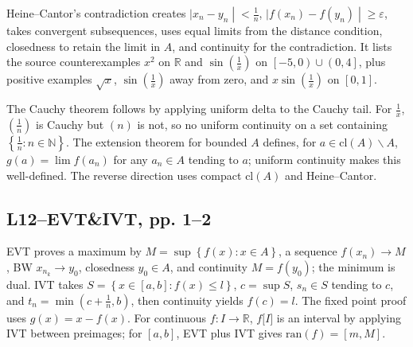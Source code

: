 Heine--Cantor's contradiction creates \(\left. |x_{n} - y_{n} \middle| < \frac{1}{n} \right.\), \(\left. |f\left( x_{n} \right) - f\left( y_{n} \right) \middle| \geq \varepsilon \right.\), takes convergent subsequences, uses equal limits from the distance condition, closedness to retain the limit in \(A\), and continuity for the contradiction. It lists the source counterexamples \(x^{2}\) on \(\mathbb{R}\) and \(\sin\left( \frac{1}{x} \right)\) on \(\left\lbrack {- 5,0} \right) \cup \left( {0,4} \right\rbrack\), plus positive examples \(\sqrt{x}\), \(\sin\left( \frac{1}{x} \right)\) away from zero, and \(x\sin\left( \frac{1}{x} \right)\) on \(\left\lbrack {0,1} \right\rbrack\).

The Cauchy theorem follows by applying uniform delta to the Cauchy tail. For \(\frac{1}{x}\), \(\left( \frac{1}{n} \right)\) is Cauchy but \((n)\) is not, so no uniform continuity on a set containing \(\left\{ {\frac{1}{n}:n \in \mathbb{N}} \right\}\). The extension theorem for bounded \(A\) defines, for \(a \in \text{cl}(A) \smallsetminus A\), \(g(a) = \lim f\left( a_{n} \right)\) for any \(a_{n} \in A\) tending to \(a\); uniform continuity makes this well-defined. The reverse direction uses compact \(\text{cl}(A)\) and Heine--Cantor.

\subsection{L12--EVT\&IVT, pp. 1--2}

EVT proves a maximum by \(M = \sup\left\{ {f(x):x \in A} \right\}\), a sequence \(f\left( x_{n} \right)\rightarrow M\), BW \(x_{n_{k}}\rightarrow y_{0}\), closedness \(y_{0} \in A\), and continuity \(M = f\left( y_{0} \right)\); the minimum is dual. IVT takes \(S = \left\{ {x \in \left\lbrack {a,b} \right\rbrack:f(x) \leq l} \right\}\), \(c = \sup S\), \(s_{n} \in S\) tending to \(c\), and \(t_{n} = \min\left( {c + \frac{1}{n},b} \right)\), then continuity yields \(f(c) = l\). The fixed point proof uses \(g(x) = x - f(x)\). For continuous \(f:I\rightarrow\mathbb{R}\), \(f\lbrack I\rbrack\) is an interval by applying IVT between preimages; for \(\left\lbrack {a,b} \right\rbrack\), EVT plus IVT gives \(\text{ran}(f) = \left\lbrack {m,M} \right\rbrack\).
